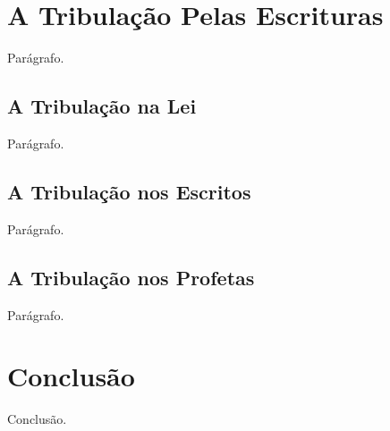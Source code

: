 
\section{A Tribulação Pelas Escrituras}

    Parágrafo.

\subsection{A Tribulação na Lei}

    Parágrafo.

\subsection{A Tribulação nos Escritos}

    Parágrafo.

\subsection{A Tribulação nos Profetas}

    Parágrafo.



\section{Conclusão}

    Conclusão.

